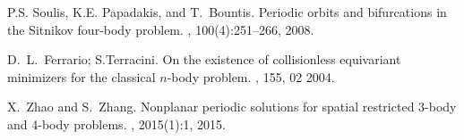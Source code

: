 \documentclass[smallcondensed]{svjour3}
\begin{document}
\begin{thebibliography}{10}
P.S. Soulis, K.E. Papadakis, and T.~Bountis.
\newblock Periodic orbits and bifurcations in the {S}itnikov four-body problem.
, 100(4):251--266,
  2008.

D.~L.~Ferrario; S.Terracini.
\newblock On the existence of collisionless equivariant minimizers for the
  classical $n$-body problem.
, 155, 02 2004.

X.~Zhao and S.~Zhang.
\newblock Nonplanar periodic solutions for spatial restricted 3-body and 4-body
  problems.
, 2015(1):1, 2015.

\end{thebibliography}
\end{document}
